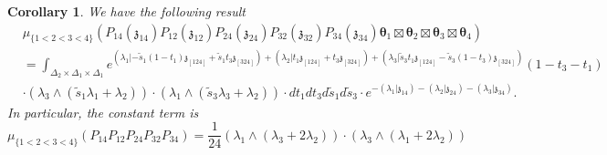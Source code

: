 \documentclass[11pt]{amsart}
\newcommand{\agraphW}{
  \mathbf{W}_{\tikz[baseline=-0.5ex]{
      \coordinate (A) at (0,0);
      \coordinate (B) at (4mm,0);
      \coordinate (C) at (2mm,2mm);
      \coordinate (D) at (2mm,-2mm);

      \fill (A) circle (0.5mm);
      \fill (B) circle (0.5mm);
      \fill (C) circle (0.5mm);
      \fill (D) circle (0.5mm);

      \draw (A) -- (C);
      \draw (A) -- (D);
      \draw (C) -- (D);
      \draw (B) -- (C);
      \draw (B) -- (D);
  }}
}
\newtheorem{cor}[thm]{Corollary}
\theoremstyle{definition}
\theoremstyle{remark}
\numberwithin{equation}{section}
\begin{document}
\iffalse
\begin{proof}


\begin{tabular}{|c|c|c|}
\hline
  & $\displaystyle \lambda _{1}$ & $\displaystyle \lambda _{2}$ \\
\hline
 $\displaystyle \mathfrak{z}_{1o}$ & $\displaystyle \boxed{r_1-1=l_{1o} -1}$ & $ $$\displaystyle -t_{1} =\boxed{-l_{12} +l_{1o} +1=-l_{2o}}$ \\
\hline
 $\displaystyle \mathfrak{z}_{2o}$ & $\displaystyle \boxed{-l_{1o}}$ & $\displaystyle -1+t_{1} =\boxed{-l_{2o} -1}$ \\
\hline
 $\displaystyle \mathfrak{z}_{12}$ & $\displaystyle \boxed{-l_{1o}}$ & $\displaystyle t_{1} =\boxed{-l_{21} -l_{1o} +1=l_{o2}}$ \\
 \hline
\end{tabular}

$$
\agraphW
$$
  \begin{align*}
     & F_{o,2o}\wedge F_{o,21} \\
     & =l_{1o}\cdot \lambda_1\wedge\lambda_2.
  \end{align*}
  $$
   \mathbf{L}_{\Gamma,\mathbf{H}(o,e)}=\frac{l_{1o}-1}{(l_{2o}-l_{21})(l_{2o}-l_{21}+1)}=\frac{1}{l_{1o}}.
  $$
\end{proof}
\fi
\begin{cor}
    We have the following result
    \begin{align*}
&\mu_{\{1<2<3<4\}}\left(P_{14}(\mathfrak{z}_{14})P_{12}(\mathfrak{z}_{12})P_{24}(\mathfrak{z}_{24})P_{32}(\mathfrak{z}_{32})P_{34}(\mathfrak{z}_{34})\boldsymbol{\theta}_1\boxtimes \boldsymbol{\theta}_2\boxtimes\boldsymbol{\theta}_3\boxtimes \boldsymbol{\theta}_4\right)\\
&=\int_{\Delta_2\times\Delta_1\times\Delta_1}e^{   (\lambda_1|-\tilde{s}_1(1-t_1)\mathfrak{z}_{[124]}+\tilde{s}_1t_3\mathfrak{z}_{[324]})+ (\lambda_2|t_1\mathfrak{z}_{[124]}+t_3 \mathfrak{z}_{[324]})+      (\lambda_3|\tilde{s}_3t_1\mathfrak{z}_{[124]}-\tilde{s}_3(1-t_3)\mathfrak{z}_{[324]})}(1-t_3-t_1)\\
   &\cdot(\lambda_3\wedge(\tilde{s}_1\lambda_1+\lambda_2))\cdot (\lambda_1\wedge(\tilde{s}_3\lambda_3+\lambda_2)) \cdot dt_1dt_3d\tilde{s}_1d\tilde{s}_3\cdot e^{-(\lambda_1|\mathfrak{z}_{14})-(\lambda_2|\mathfrak{z}_{24})-(\lambda_3|\mathfrak{z}_{34})}.
      \end{align*}
    In particular, the constant term is
    $$
    \mu_{\{1<2<3<4\}}\left(P_{14}P_{12}P_{24}P_{32}P_{34}\right)=\frac{1}{24}(\lambda_1\wedge(\lambda_3+2\lambda_2))\cdot (\lambda_3\wedge(\lambda_1+2\lambda_2))
    $$
\end{cor}
\end{document}

